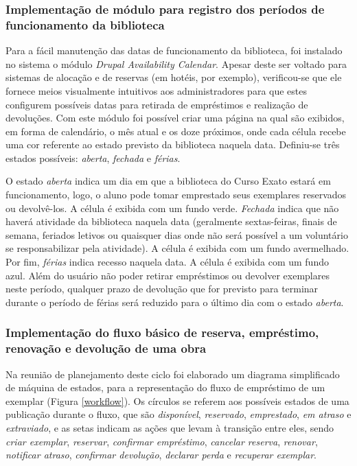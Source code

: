 \documentclass[a4paper]{article}
\begin{document}
\subsubsection{Implementação de módulo para registro dos períodos de funcionamento da biblioteca}
Para a fácil manutenção das datas de funcionamento da biblioteca, foi instalado no sistema o módulo \textit{Drupal Availability Calendar}. Apesar deste ser voltado para sistemas de alocação e de reservas (em hotéis, por exemplo), verificou-se que ele fornece meios visualmente intuitivos aos administradores para que estes configurem possíveis datas para retirada de empréstimos e realização de devoluções. Com este módulo foi possível criar uma página na qual são exibidos, em forma de calendário, o mês atual e os doze próximos, onde cada célula recebe uma cor referente ao estado previsto da biblioteca naquela data. Definiu-se três estados possíveis: \textit{aberta}, \textit{fechada} e \textit{férias}.

O estado \textit{aberta} indica um dia em que a biblioteca do Curso Exato estará em funcionamento, logo, o aluno pode tomar emprestado seus exemplares reservados ou devolvê-los. A célula é exibida com um fundo verde. \textit{Fechada} indica que  não haverá atividade da biblioteca naquela data (geralmente sextas-feiras, finais de semana, feriados letivos ou quaisquer dias onde não será possível a um voluntário se responsabilizar pela atividade). A célula é exibida com um fundo avermelhado. Por fim, \textit{férias} indica recesso naquela data. A célula é exibida com um fundo azul. Além do usuário não poder retirar empréstimos ou devolver exemplares neste período, qualquer prazo de devolução que for previsto para terminar durante o período de férias será reduzido para o último dia com o estado \textit{aberta}.

\subsubsection{Implementação do fluxo básico de reserva, empréstimo, renovação e devolução de uma obra} \label{sssec:stransaction}
Na reunião de planejamento deste ciclo foi elaborado um diagrama simplificado de máquina de estados, para a representação do fluxo de empréstimo de um exemplar (Figura \ref{workflow}). Os círculos se referem aos possíveis estados de uma publicação durante o fluxo, que são \textit{disponível}, \textit{reservado}, \textit{emprestado}, \textit{em atraso} e \textit{extraviado}, e as setas indicam as ações que levam à transição entre eles, sendo \textit{criar exemplar}, \textit{reservar}, \textit{confirmar empréstimo}, \textit{cancelar reserva}, \textit{renovar}, \textit{notificar atraso}, \textit{confirmar devolução}, \textit{declarar perda} e \textit{recuperar exemplar}.
\end{document}

